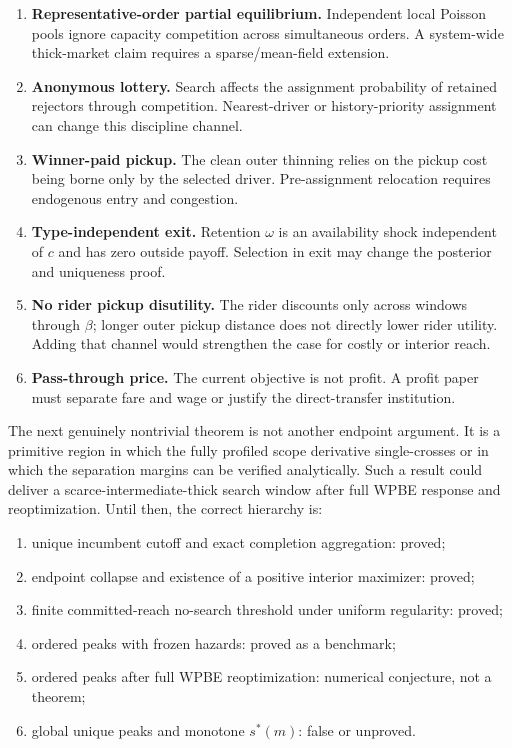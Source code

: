 \documentclass[11pt]{article}
\theoremstyle{definition}
\theoremstyle{remark}
\begin{document}
\begin{enumerate}[leftmargin=2em]
\item \textbf{Representative-order partial equilibrium.}  Independent local
Poisson pools ignore capacity competition across simultaneous orders.  A
system-wide thick-market claim requires a sparse/mean-field extension.
\item \textbf{Anonymous lottery.}  Search affects the assignment probability
of retained rejectors through competition.  Nearest-driver or history-priority
assignment can change this discipline channel.
\item \textbf{Winner-paid pickup.}  The clean outer thinning relies on the
pickup cost being borne only by the selected driver.  Pre-assignment
relocation requires endogenous entry and congestion.
\item \textbf{Type-independent exit.}  Retention $\omega$ is an availability
shock independent of $c$ and has zero outside payoff.  Selection in exit may
change the posterior and uniqueness proof.
\item \textbf{No rider pickup disutility.}  The rider discounts only across
windows through $\beta$; longer outer pickup distance does not directly lower
rider utility.  Adding that channel would strengthen the case for costly or
interior reach.
\item \textbf{Pass-through price.}  The current objective is not profit.  A
profit paper must separate fare and wage or justify the direct-transfer
institution.
\end{enumerate}

The next genuinely nontrivial theorem is not another endpoint argument.  It is
a primitive region in which the fully profiled scope derivative single-crosses
or in which the separation margins can be verified analytically.  Such a
result could deliver a scarce-intermediate-thick search window after full WPBE
response and reoptimization.  Until then, the correct hierarchy is:

\begin{enumerate}[leftmargin=2em]
\item unique incumbent cutoff and exact completion aggregation: proved;
\item endpoint collapse and existence of a positive interior maximizer:
proved;
\item finite committed-reach no-search threshold under uniform regularity:
proved;
\item ordered peaks with frozen hazards: proved as a benchmark;
\item ordered peaks after full WPBE reoptimization: numerical conjecture,
not a theorem;
\item global unique peaks and monotone $s^*(m)$: false or unproved.
\end{enumerate}
\end{document}
